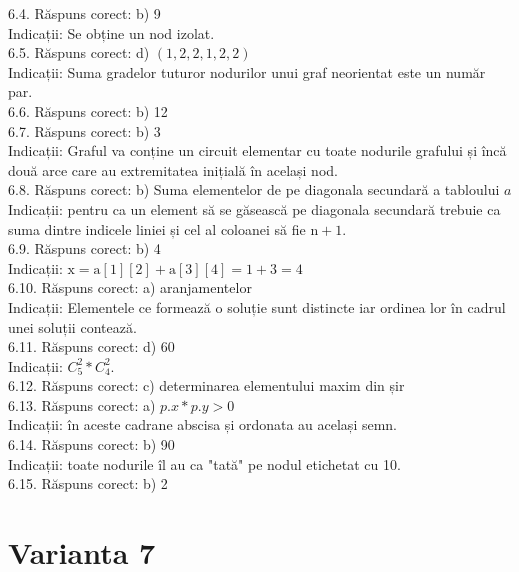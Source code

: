 6.4. Răspuns corect: b) 9\\
Indicații: Se obține un nod izolat.\\

6.5. Răspuns corect: d) $(1,2,2,1,2,2)$\\
Indicații: Suma gradelor tuturor nodurilor unui graf neorientat este un număr par.\\

6.6. Răspuns corect: b) 12\\

6.7. Răspuns corect: b) 3\\
Indicații: Graful va conține un circuit elementar cu toate nodurile grafului și încă două arce care au extremitatea inițială în același nod.\\

6.8. Răspuns corect: b) Suma elementelor de pe diagonala secundară a tabloului $a$\\
Indicații: pentru ca un element să se găsească pe diagonala secundară trebuie ca suma dintre indicele liniei și cel al coloanei să fie $\mathrm{n}+1$.\\

6.9. Răspuns corect: b) 4\\
Indicații: $\mathrm{x}=\mathrm{a}[1][2]+\mathrm{a}[3][4]=1+3=4$\\

6.10. Răspuns corect: a) aranjamentelor\\
Indicații: Elementele ce formează o soluție sunt distincte iar ordinea lor în cadrul unei soluții contează.\\

6.11. Răspuns corect: d) 60\\
Indicații: $C_{5}^{2} * C_{4}^{2}$.\\

6.12. Răspuns corect: c) determinarea elementului maxim din șir\\

6.13. Răspuns corect: a) $p.x*p.y>0$\\
Indicații: în aceste cadrane abscisa și ordonata au același semn.\\

6.14. Răspuns corect: b) 90\\
Indicații: toate nodurile îl au ca "tată" pe nodul etichetat cu 10.\\

6.15. Răspuns corect: b) 2\\

\section*{Varianta 7}


